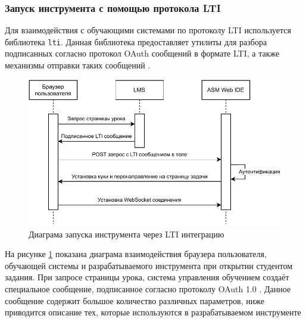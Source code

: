 \documentclass[a4paper,article,14pt]{extarticle}
\begin{document}
\subsubsection{Запуск инструмента с помощью протокола LTI}

Для взаимодействия с обучающими системами по протоколу LTI используется библиотека \texttt{lti}. Данная библиотека предоставляет утилиты для разбора подписанных согласно протокол OAuth сообщений в формате LTI, а также механизмы отправки таких сообщений \cite{pythonlti}.

\begin{figure}[ht]
    \centering
    \includegraphics{images/lti.pdf}
    \caption{Диаграма запуска инструмента через LTI интеграцию}
    \label{fig:lti_diagram}
\end{figure}

На рисунке \ref{fig:lti_diagram} показана диаграма взаимодействия браузера пользователя, обучающей системы и разрабатываемого инструмента при открытии студентом задания. При запросе страницы урока, система управления обучением создаёт специальное сообщение, подписанное согласно протоколу OAuth 1.0 \cite{lti}. Данное сообщение содержит большое количество различных параметров, ниже приводится описание тех, которые используются в разрабатываемом инструменте
\end{document}
